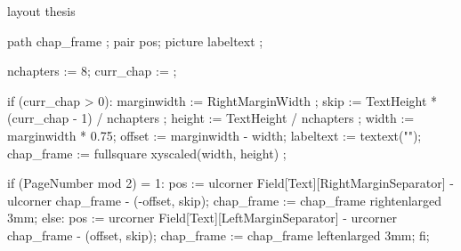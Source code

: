 \startenvironment layout
\product thesis


\usemodule[units]
\usemodule[bibtex]



\setupinteraction[state=start]
\setuppapersize[ThesisSize]
\setuplayout[location=middle, width=13.0cm, height=22cm, 
             topspace=1.0cm, bottomspace=1.0cm, margin=2.0cm, 
             header=1.0cm, footer=1.0cm]

{}

\setuppagenumbering[alternative=doublesided, location=right]


\definecolor[tableheadcolor][darkgray]
\definecolor[tableoddrow][gray]
    path chap_frame ;
    pair pos;  
    picture labeltext ;
  
    nchapters := 8;
    curr_chap :=  ; 
  
    if (curr_chap > 0):
           marginwidth := RightMarginWidth ;
           skip   := TextHeight * (curr_chap - 1) / nchapters ;
           height := TextHeight / nchapters ;
           width  := marginwidth * 0.75;
           offset := marginwidth - width;
           labeltext := textext("\ssbfd \white \getmarking[chapternumber]");
           chap_frame := fullsquare xyscaled(width, height) ;

           if (PageNumber mod 2) = 1:
               pos := ulcorner Field[Text][RightMarginSeparator] -
                      ulcorner chap_frame - (-offset, skip);
               chap_frame := chap_frame rightenlarged 3mm;
           else:
               pos := urcorner Field[Text][LeftMarginSeparator] -
                      urcorner chap_frame - (offset, skip);
               chap_frame := chap_frame leftenlarged 3mm;
           fi;

